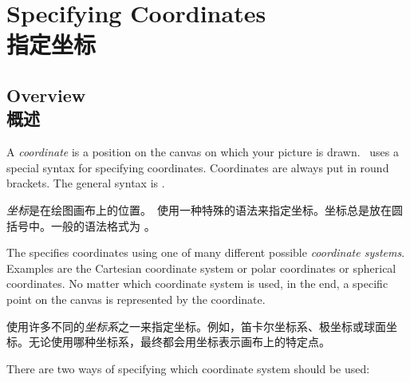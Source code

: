%
%
%


\section{Specifying Coordinates\\指定坐标}

\subsection{Overview\\概述}

A \emph{coordinate} is a position on the canvas on which your picture is drawn.
\tikzname\ uses a special syntax for specifying coordinates. Coordinates are
always put in round brackets. The general syntax is
.


\emph{坐标}是在绘图画布上的位置。\tikzname\ 使用一种特殊的语法来指定坐标。坐标总是放在圆括号中。一般的语法格式为
。


The  specifies coordinates using one of many
different possible \emph{coordinate systems}. Examples are the Cartesian
coordinate system or polar coordinates or spherical coordinates. No matter
which coordinate system is used, in the end, a specific point on the canvas is
represented by the coordinate.

使用许多不同的\emph{坐标系}之一来指定坐标。例如，笛卡尔坐标系、极坐标或球面坐标。无论使用哪种坐标系，最终都会用坐标表示画布上的特定点。

There are two ways of specifying which coordinate system should be used:

